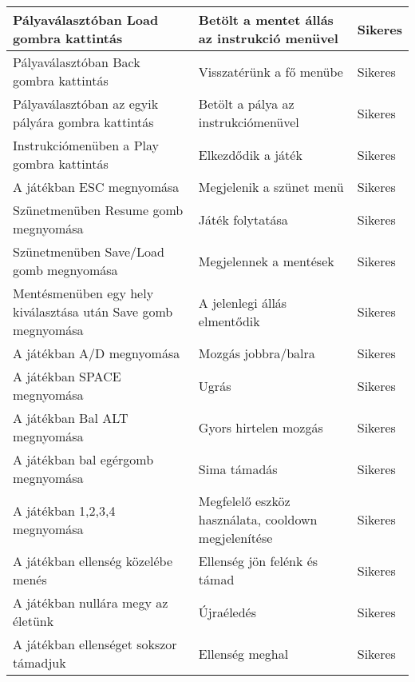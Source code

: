 \begin{center}
\begin{longtable}{| m{} | m{} | m{}|}
		Pályaválasztóban Load gombra kattintás & Betölt a mentet állás az instrukció menüvel & Sikeres\\ \hline
		
		Pályaválasztóban Back gombra kattintás & Visszatérünk a fő menübe & Sikeres\\ \hline
		
		Pályaválasztóban az egyik pályára gombra kattintás & Betölt a pálya az instrukciómenüvel & Sikeres\\ \hline
		
		Instrukciómenüben a Play gombra kattintás & Elkezdődik a játék & Sikeres\\ \hline
		
		A játékban ESC megnyomása & Megjelenik a szünet menü & Sikeres\\ \hline
		
		Szünetmenüben Resume gomb megnyomása & Játék folytatása & Sikeres\\ \hline
		
		Szünetmenüben Save/Load gomb megnyomása & Megjelennek a mentések & Sikeres\\ \hline
		
		Mentésmenüben egy hely kiválasztása után Save gomb megnyomása & A jelenlegi állás elmentődik & Sikeres\\ \hline
		
		A játékban A/D megnyomása & Mozgás jobbra/balra & Sikeres\\ \hline
		
		A játékban SPACE megnyomása & Ugrás & Sikeres\\ \hline
		
		A játékban Bal ALT megnyomása & Gyors hirtelen mozgás & Sikeres\\ \hline
		
		A játékban bal egérgomb megnyomása & Sima támadás & Sikeres\\ \hline
		
		A játékban 1,2,3,4 megnyomása & Megfelelő eszköz használata, cooldown megjelenítése & Sikeres\\ \hline
		
		A játékban ellenség közelébe menés & Ellenség jön felénk és támad & Sikeres\\ \hline
		
		A játékban nullára megy az életünk & Újraéledés & Sikeres\\ \hline
		
		A játékban ellenséget sokszor támadjuk & Ellenség meghal & Sikeres\\ \hline
		

\end{longtable}
\end{center}
